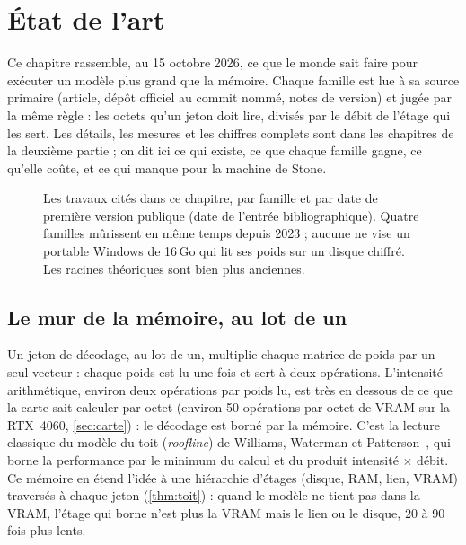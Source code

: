 \chapter{État de l'art}\label{ch:etat}

\begin{origine}
Ce chapitre rassemble, au 15 octobre 2026, ce que le monde sait faire pour exécuter un modèle plus grand que la mémoire. Chaque famille est lue à sa source primaire (article, dépôt officiel au commit nommé, notes de version) et jugée par la même règle : les octets qu'un jeton doit lire, divisés par le débit de l'étage qui les sert. Les détails, les mesures et les chiffres complets sont dans les chapitres de la deuxième partie ; on dit ici ce qui existe, ce que chaque famille gagne, ce qu'elle coûte, et ce qui manque pour la machine de Stone.
\end{origine}

\begin{figure}[ht]
\centering
\resizebox{\linewidth}{!}{\SchemaChronologie}
\caption[Chronologie des travaux, par famille]{Les travaux cités dans ce chapitre, par famille et par date de première version publique (date de l'entrée bibliographique). Quatre familles mûrissent en même temps depuis 2023 ; aucune ne vise un portable Windows de 16\,Go qui lit ses poids sur un disque chiffré. Les racines théoriques sont bien plus anciennes.}
\label{fig:chronologie}
\end{figure}

\section{Le mur de la mémoire, au lot de un}\label{sec:mur}

Un jeton de décodage, au lot de un, multiplie chaque matrice de poids par un seul vecteur : chaque poids est lu une fois et sert à deux opérations. L'intensité arithmétique, environ deux opérations par poids lu, est très en dessous de ce que la carte sait calculer par octet (environ 50 opérations par octet de VRAM sur la RTX~4060, \cref{sec:carte}) : le décodage est borné par la mémoire. C'est la lecture classique du modèle du toit (\emph{roofline}) de Williams, Waterman et Patterson~\cite{williams2009roofline}, qui borne la performance par le minimum du calcul et du produit intensité $\times$ débit. Ce mémoire en étend l'idée à une hiérarchie d'étages (disque, RAM, lien, VRAM) traversés à chaque jeton (\cref{thm:toit}) : quand le modèle ne tient pas dans la VRAM, l'étage qui borne n'est plus la VRAM mais le lien ou le disque, 20 à 90 fois plus lents.

